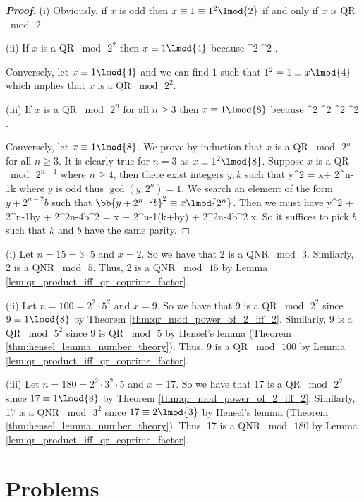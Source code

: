 \begin{proof}[\bf Proof]
\ben
\item [(i)] Obviously,  if $x$ is odd then $x\equiv 1\equiv 1^2 \lmod{2}$ if and only if $x$ is QR $\bmod\, 2$. 
\item [(ii)] If $x$ is a QR $\bmod\, 2^2$ then $x\equiv 1\lmod{4}$ because
^2 ^2  .
\ee 

Conversely, let $x\equiv 1\lmod{4}$ and we can find $1$ such that $1^2 = 1\equiv x\lmod{4}$ which implies that $x$ is a QR $\bmod\, 2^2$.

\item [(iii)] If $x$ is a QR $\bmod\, 2^n$ for all $n\geq 3$ then $x\equiv 1 \lmod{8}$ because
^2 ^2 ^2 ^2  .
\ee%

Conversely, let $x\equiv 1 \lmod{8}$. We prove by induction that $x$ is a QR $\bmod\, 2^n$ for all $n\geq 3$. It is clearly true for $n=3$ as $x\equiv 1^2\lmod{8}$. Suppose $x$ is a QR $\bmod\,2^{n-1}$ where $n\geq 4$, then there exist integers $y,k$ such that
\be
y^2 = x+ 2^{n-1}k
\ee
where $y$ is odd thus $\gcd(y,2^n)=1$. We search an element of the form $y + 2^{n-2}b$ such that $\bb{y + 2^{n-2}b}^2 \equiv x \lmod{2^n}$. Then we must have 
\be
y^2 + 2^{n-1}by + 2^{2n-4}b^2 = x + 2^{n-1}(k+by) + 2^{2n-4}b^2 \equiv x.
\ee
So it suffices to pick $b$ such that $k$ and $b$ have the same parity. %
\een
\end{proof}

\begin{example}
\ben
\item [(i)] Let $n = 15= 3\cdot 5$ and $x = 2$. So we have that 2 is a QNR $\bmod\, 3$. Similarly, 2 is a QNR $\bmod\, 5$. Thus, 2 is a QNR $\bmod\, 15$ by Lemma \ref{lem:qr_product_iff_qr_coprime_factor}.

\item [(ii)] Let $n = 100 = 2^2\cdot 5^2$ and $x = 9$. So we have that 9 is a QR $\bmod\, 2^2$ since $9\equiv 1\lmod{8}$ by Theorem \ref{thm:qr_mod_power_of_2_iff_2}. Similarly, 9 is a QR $\bmod\, 5^2$ since 9 is QR $\bmod \, 5$ by Hensel's lemma (Theorem \ref{thm:hensel_lemma_number_theory}). Thus, 9 is a QR $\bmod\, 100$ by Lemma \ref{lem:qr_product_iff_qr_coprime_factor}.

\item [(iii)] Let $n = 180 = 2^2\cdot 3^2\cdot 5 $ and $x = 17$. So we have that 17 is a QR $\bmod\, 2^2$ since $17\equiv 1\lmod{8}$ by Theorem \ref{thm:qr_mod_power_of_2_iff_2}. Similarly, 17 is a QNR $\bmod\, 3^2$ since $17\equiv 2\lmod{3}$ by Hensel's lemma (Theorem \ref{thm:hensel_lemma_number_theory}). Thus, 17 is a QNR $\bmod\, 180$ by Lemma \ref{lem:qr_product_iff_qr_coprime_factor}.
\een
\end{example}


\section{Problems}

